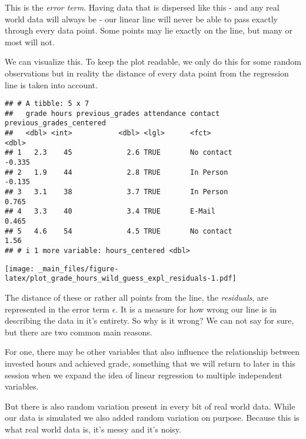 \documentclass[
]{book}
\begin{document}
This is the \emph{error term}. Having data that is dispersed like this - and any real
world data will always be - our linear line will never be able to pass exactly
through every data point. Some points may lie exactly on the line, but many or
most will not.

We can visualize this. To keep the plot readable, we only do this for some
random observations but in reality the distance of every data point from the
regression line is taken into account.

\begin{verbatim}
## # A tibble: 5 x 7
##   grade hours previous_grades attendance contact    previous_grades_centered
##   <dbl> <int>           <dbl> <lgl>      <fct>                         <dbl>
## 1   2.3    45             2.6 TRUE       No contact                   -0.335
## 2   1.9    44             2.8 TRUE       In Person                    -0.135
## 3   3.1    38             3.7 TRUE       In Person                     0.765
## 4   3.3    40             3.4 TRUE       E-Mail                        0.465
## 5   4.6    54             4.5 TRUE       No contact                    1.56 
## # i 1 more variable: hours_centered <dbl>
\end{verbatim}

\texttt{[image: \_main\_files/figure-latex/plot\_grade\_hours\_wild\_guess\_expl\_residuals-1.pdf]}

The distance of these or rather all points from the line, the \emph{residuals}, are
represented in the error term \(\epsilon\). It is a measure for how wrong our line
is in describing the data in it's entirety. So why is it wrong? We can not say
for sure, but there are two common main reasons.

For one, there may be other variables that also influence the relationship
between invested hours and achieved grade, something that we will return to
later in this session when we expand the idea of linear regression to multiple
independent variables.

But there is also random variation present in every bit of real world data.
While our data is simulated we also added random variation on purpose. Because
this is what real world data is, it's messy and it's noisy.
\end{document}
